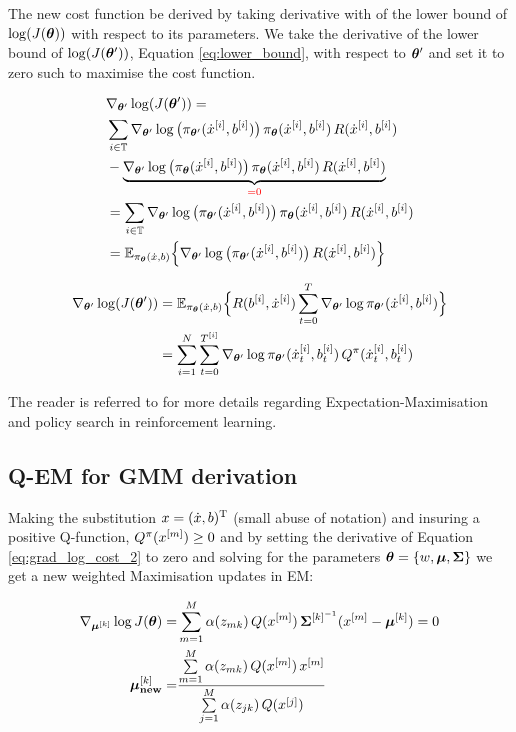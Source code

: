 The new cost function be derived by taking derivative with of the lower bound of $\log(J(\boldsymbol{\theta}))$ with respect to its parameters.
We take the derivative of the lower bound of $\log(J(\boldsymbol{\theta}'))$, Equation \ref{eq:lower_bound}, with respect to $\boldsymbol{\theta}'$ and set it to 
zero such to maximise the cost function.

\begin{align}
 &\nabla_{\boldsymbol{\theta}'}  \log( J(\boldsymbol{\theta}') ) = \nonumber\\
 &\sum_{i \in \mathbb{T}} \nabla_{\boldsymbol{\theta}'} \log\big( \pi_{\boldsymbol{\theta}'}(\dot{x}^{[i]},b^{[i]})\big) \, \pi_{\boldsymbol{\theta}}(\dot{x}^{[i]},b^{[i]}) \, R(\dot{x}^{[i]},b^{[i]}) \nonumber \\
				    & - \underbrace{ \nabla_{\boldsymbol{\theta}'} \log\big( \pi_{\boldsymbol{\theta}}(\dot{x}^{[i]},b^{[i]})\big) \, \pi_{\boldsymbol{\theta}}(\dot{x}^{[i]},b^{[i]}) \, R(\dot{x}^{[i]},b^{[i]})}_{\color{red} =0} \nonumber \\
				    &= \sum_{i \in \mathbb{T}} \nabla_{\boldsymbol{\theta}'} \log\big( \pi_{\boldsymbol{\theta}'}(\dot{x}^{[i]},b^{[i]})\big) \, \pi_{\boldsymbol{\theta}}(\dot{x}^{[i]},b^{[i]}) \, R(\dot{x}^{[i]},b^{[i]}) \nonumber \\
				    &= \mathbb{E}_{\pi_{\boldsymbol{\theta}}(\dot{x},b)} \Big\{ \nabla_{\boldsymbol{\theta}'} \log\big( \pi_{\boldsymbol{\theta}'}(\dot{x}^{[i]},b^{[i]})\big)\, R(\dot{x}^{[i]},b^{[i]}) \Big\}
\end{align}

\begin{align}
 \nabla_{\boldsymbol{\theta}'}  \log( J(\boldsymbol{\theta}') ) &= \mathbb{E}_{\pi_{\boldsymbol{\theta}}(\dot{x},b)}\Big\{R(b^{[i]},\dot{x}^{[i]})  \sum_{t=0}^{T}\nabla_{\boldsymbol{\theta}'}\log \pi_{\boldsymbol{\theta}'}(\dot{x}^{[i]},b^{[i]})\Big\}\\
				    &= \sum\limits_{i=1}^{N} \sum\limits_{t=0}^{T^{[i]}} \nabla_{\boldsymbol{\theta}'}\log \pi_{\boldsymbol{\theta}'}(\dot{x}^{[i]}_t,b^{[i]}_t) \, Q^{\pi}(\dot{x}^{[i]}_t,b^{[i]}_t) \label{eq:grad_log_cost_2}
\end{align}

The reader is referred to \cite{rl_gradient_survey_2013} for more details regarding Expectation-Maximisation and policy search in reinforcement learning.

\subsection{Q-EM for GMM derivation}\label{app:grad}

Making the substitution $x = (\dot{x},b)^{\mathrm{T}}$ (small abuse of notation) and  insuring a positive Q-function, $Q^{\pi}(x^{[m]}) \geq 0$
and by setting the derivative of Equation \ref{eq:grad_log_cost_2} to zero and solving for the parameters
$\boldsymbol{\theta}=\{w,\boldsymbol{\mu},\boldsymbol{\Sigma}\}$ we get a new weighted Maximisation updates in EM:

\begin{align}
\nabla_{\boldsymbol{\mu}^{[k]}} \log J(\boldsymbol{\theta}) =& \sum\limits_{m=1}^{M} \alpha(z_{mk})\, Q(x^{[m]})\, \boldsymbol{\Sigma}^{[k]^{-1}} (x^{[m]} - \boldsymbol{\mu}^{[k]}) = 0 \nonumber \\
			 \boldsymbol{\mu}^{[k]}_{\textrm{\textbf{new}}} =& \frac{\sum\limits_{m=1}^{M} \alpha(z_{mk})\, Q(x^{[m]})\, x^{[m]} }{\sum\limits_{j=1}^{M} \alpha(z_{jk})\, Q(x^{[j]})}
\end{align}

